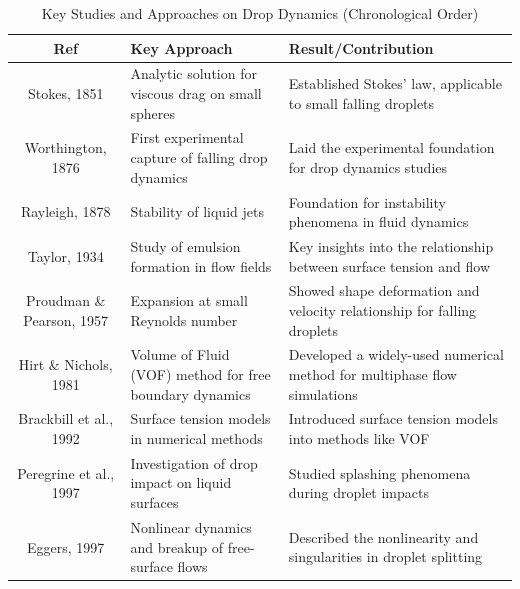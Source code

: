 \documentclass[12pt]{article}
\begin{document}
\begin{table}[htbp]
\scriptsize
\centering
\caption{Key Studies and Approaches on Drop Dynamics (Chronological Order)}
\renewcommand{\arraystretch}{1.2} %
\begin{tabularx}{\textwidth}{|c|X|X|}
\hline
\textbf{Ref}                 & \textbf{Key Approach}                                                 & \textbf{Result/Contribution}                                                            \\ \hline
Stokes, 1851                 & Analytic solution for viscous drag on small spheres                    & Established Stokes' law, applicable to small falling droplets                           \\ \hline
Worthington, 1876            & First experimental capture of falling drop dynamics                    & Laid the experimental foundation for drop dynamics studies                              \\ \hline
Rayleigh, 1878               & Stability of liquid jets                                               & Foundation for instability phenomena in fluid dynamics                                  \\ \hline
Taylor, 1934                 & Study of emulsion formation in flow fields                             & Key insights into the relationship between surface tension and flow                     \\ \hline
Proudman \& Pearson, 1957    & Expansion at small Reynolds number                                     & Showed shape deformation and velocity relationship for falling droplets                 \\ \hline
Hirt \& Nichols, 1981        & Volume of Fluid (VOF) method for free boundary dynamics                & Developed a widely-used numerical method for multiphase flow simulations                \\ \hline
Brackbill et al., 1992       & Surface tension models in numerical methods                            & Introduced surface tension models into methods like VOF                                 \\ \hline
Peregrine et al., 1997       & Investigation of drop impact on liquid surfaces                        & Studied splashing phenomena during droplet impacts                                      \\ \hline
Eggers, 1997                 & Nonlinear dynamics and breakup of free-surface flows                   & Described the nonlinearity and singularities in droplet splitting                       \\ \hline

\end{tabularx}
\end{table}
\end{document}
